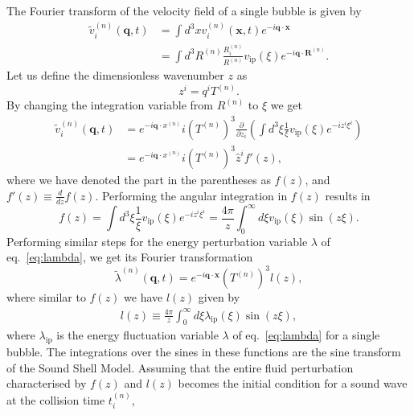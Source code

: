 The Fourier transform of the velocity field of a single bubble is given by
\cite[eq. 4.3]{hindmarsh_gw_pt_2019}
\begin{align}
\tilde{v}_i^{(n)} (\mathbf{q},t)
&= \int d^3 x v_i^{(n)} (\mathbf{x},t) e^{-i \mathbf{q} \cdot \mathbf{x}} \\
&= \int d^3 R^{(n)} \frac{R_i^{(n)}}{R^{(n)}} v_\text{ip}(\xi) e^{-i \mathbf{q} \cdot \mathbf{R}^{(n)}}.
\end{align}
Let us define the dimensionless wavenumber $z$ as
\begin{equation}
z^i = q^i T^{(n)}.
\end{equation}
By changing the integration variable from $R^{(n)}$ to $\xi$ we get
\cite[eq. 4.4, eq. 4.6]{hindmarsh_gw_pt_2019}
\begin{align}
\tilde{v}_i^{(n)} (\mathbf{q},t)
&= e^{-i \mathbf{q} \cdot x^{(n)}} i (T^{(n)})^3 \frac{\partial}{\partial z_i} \left(
\int d^3 \xi \frac{1}{\xi} v_\text{ip}(\xi) e^{-i z^i \xi^i} \right) \\
&= e^{-i \mathbf{q} \cdot x^{(n)}} i (T^{(n)})^3 \hat{z}^i f'(z),
\end{align}
where we have denoted the part in the parentheses as $f(z)$, and $f'(z) \equiv \frac{d}{dz}f(z)$.
Performing the angular integration in $f(z)$ results in
\cite[eq. 4.5]{hindmarsh_gw_pt_2019}
\begin{equation}
f(z) = \int d^3\xi \frac{1}{\xi} v_\text{ip}(\xi) e^{-iz^i \xi^i}
= \frac{4\pi}{z} \int_0^\infty d\xi v_\text{ip}(\xi) \sin(z\xi).
\label{eq:ssm_f}
\end{equation}
Performing similar steps for the energy perturbation variable $\lambda$ of eq.~\eqref{eq:lambda},
we get its Fourier transformation
\begin{equation}
\tilde{\lambda}^{(n)}(\mathbf{q},t) = e^{-i \mathbf{q} \cdot \mathbf{x}} (T^{(n)})^3 l(z),
\end{equation}
where similar to $f(z)$ we have $l(z)$ given by
\cite[eq. 4.8]{hindmarsh_gw_pt_2019}
\begin{align}
l(z) \equiv \frac{4 \pi}{z} \int_0^\infty d\xi \lambda_\text{ip}(\xi) \sin(z\xi),
\label{eq:ssm_l}
\end{align}
where $\lambda_\text{ip}$ is the energy fluctuation variable $\lambda$ of eq.~\eqref{eq:lambda} for a single bubble.
The integrations over the sines in these functions are the sine transform of the Sound Shell Model.
Assuming that the entire fluid perturbation characterised by $f(z)$ and $l(z)$ becomes the initial condition for a sound wave at the collision time $t_i^{(n)}$,

